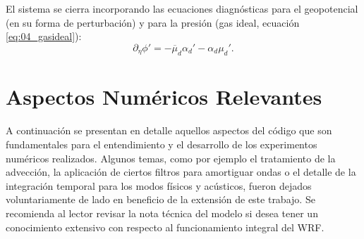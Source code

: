 El sistema se cierra incorporando las ecuaciones diagnósticas para el geopotencial (en su forma de perturbación) y para la presión (gas ideal, ecuación \ref{eq:04_gasideal}):
\begin{equation}
\partial_\eta \phi ' = -\overline{\mu}_d \alpha_d' - \alpha_d \mu_d'.
\end{equation}

\newpage
\section{Aspectos Numéricos Relevantes}
A continuación se presentan en detalle aquellos aspectos del código que son fundamentales para el entendimiento y el desarrollo de los experimentos numéricos realizados. Algunos temas, como por ejemplo el tratamiento de la advección, la aplicación de ciertos filtros para amortiguar ondas o el detalle de la integración temporal para los modos físicos y acústicos, fueron dejados voluntariamente de lado en beneficio de la extensión de este trabajo. Se recomienda al lector revisar la nota técnica del modelo \citep{https://doi.org/10.5065/d68s4mvh} si desea tener un conocimiento extensivo con respecto al funcionamiento integral del WRF.
